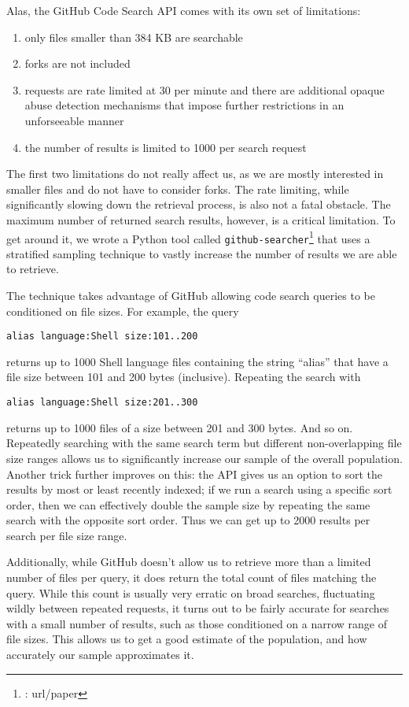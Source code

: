 Alas, the GitHub Code Search API comes with its own set of limitations:
\begin{enumerate}
    \item only files smaller than 384 KB are searchable
    \item forks are not included
    \item requests are rate limited at 30 per minute and there are additional opaque abuse detection mechanisms that impose further restrictions in an unforseeable manner
    \item the number of results is limited to 1000 per search request
\end{enumerate}
The first two limitations do not really affect us, as we are mostly interested in smaller files and do not have to consider forks.
The rate limiting, while significantly slowing down the retrieval process, is also not a fatal obstacle.
The maximum number of returned search results, however, is a critical limitation.
To get around it, we wrote a Python tool called \verb|github-searcher|\footnote{\TODO: url/paper} that uses a stratified sampling technique to vastly increase the number of results we are able to retrieve.

The technique takes advantage of GitHub allowing code search queries to be conditioned on file sizes. 
For example, the query 
\begin{verbatim}
alias language:Shell size:101..200
\end{verbatim}
returns up to 1000 Shell language files containing the string ``alias'' that have a file size between 101 and 200 bytes (inclusive).
Repeating the search with 
\begin{verbatim}
alias language:Shell size:201..300
\end{verbatim}
returns up to 1000 files of a size between 201 and 300 bytes.
And so on.
Repeatedly searching with the same search term but different non-overlapping file size ranges allows us to significantly increase our sample of the overall population.
Another trick further improves on this: 
the API gives us an option to sort the results by most or least recently indexed;
if we run a search using a specific sort order, then we can effectively double the sample size by repeating the same search with the opposite sort order.
Thus we can get up to 2000 results per search per file size range.

Additionally, while GitHub doesn't allow us to retrieve more than a limited number of files per query, it does return the total count of files matching the query.
While this count is usually very erratic on broad searches, fluctuating wildly between repeated requests, it turns out to be fairly accurate for searches with a small number of results, such as those conditioned on a narrow range of file sizes.
This allows us to get a good estimate of the population, and how accurately our sample approximates it.

